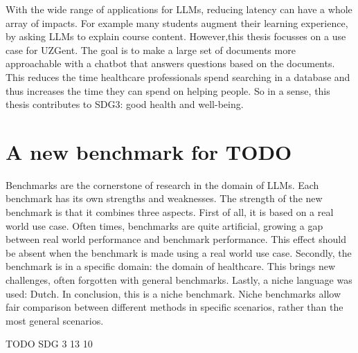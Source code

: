 With the wide range of applications for LLMs, reducing latency can have a whole array of impacts. For example many students augment their learning experience, by asking LLMs to explain course content. However,this thesis focusses on a use case for UZGent. The goal is to make a large set of documents more approachable with a chatbot that answers questions based on the documents. This reduces the time healthcare professionals spend searching in a database and thus increases the time they can spend on helping people. So in a sense, this thesis contributes to SDG3: good health and well-being.

\section{A new benchmark for TODO}
Benchmarks are the cornerstone of research in the domain of LLMs. Each benchmark has its own strengths and weaknesses. The strength of the new benchmark is that it combines three aspects. First of all, it is based on a real world use case. Often times, benchmarks are quite artificial, growing a gap between real world performance and benchmark performance. This effect should be absent when the benchmark is made using a real world use case. Secondly, the benchmark is in a specific domain: the domain of healthcare. This brings new challenges, often forgotten with general benchmarks. Lastly, a niche language was used: Dutch. In conclusion, this is a niche benchmark. Niche benchmarks allow fair comparison between different methods in specific scenarios, rather than the most general scenarios.

TODO SDG 3 13 10